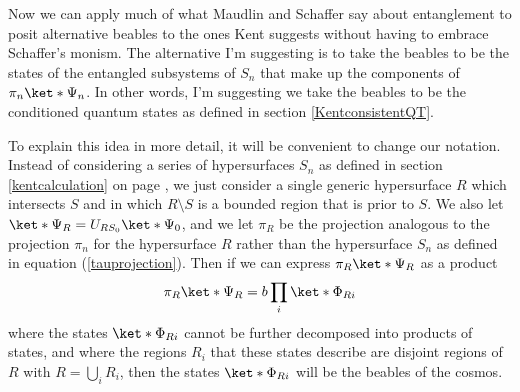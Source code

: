 \documentclass[12pt]{report}
\begin{document}
Now we can apply much of what Maudlin and Schaffer say about entanglement to posit alternative beables to the ones Kent suggests without having to embrace Schaffer's monism. The alternative I'm suggesting is to take  the beables to be the states of the entangled subsystems of $S_n$ that make up the components of $\pi_n\ket*{\Psi_n}$. In other words, I'm suggesting we take the beables to be the conditioned quantum states as defined in section \ref{KentconsistentQT}. 

To explain this idea in more detail, it will be convenient to change our notation. Instead of considering a series of hypersurfaces $S_n$ as defined in section \ref{kentcalculation} on page \pageref{siydef}, we just consider a single generic hypersurface $R$ %
%
which intersects $S$ and in which $R\setminus S$ is a bounded region that is prior to $S$. We also let $\ket*{\Psi_R}=U_{RS_0}\ket*{\Psi_0}$, %
%
and we let $\pi_R$ %
%
be the projection analogous to the projection  $\pi_n$ for the hypersurface $R$ rather than the hypersurface $S_n$ as defined in equation (\ref{tauprojection}). Then if we can express $\pi_R\ket*{\Psi_R}$ as a product 
\begin{equation}\label{beablesprod}
\pi_R\ket*{\Psi_R}=b\prod_i \ket*{\Phi_{Ri}}
\end{equation}%
%
where the states $\ket*{\Phi_{Ri}}$ cannot be further decomposed into products of states, and where the regions $R_{i}$ %
%
that these states describe are disjoint regions of $R$ with $R=\bigcup_i R_{i}$, then the states $\ket*{\Phi_{Ri}}$ will be the beables of the cosmos.
\end{document}
